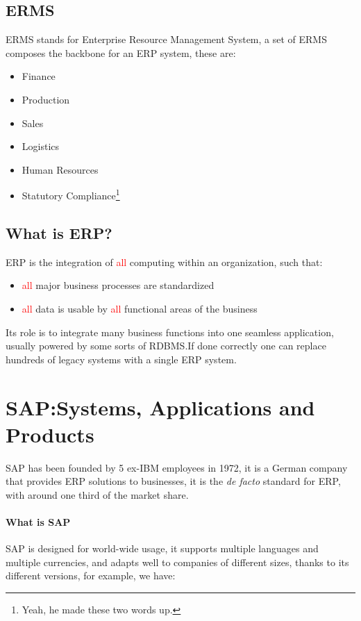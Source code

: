 \documentclass[openright, twoside, twocolumn, a4paper, 10pt]{report}
\begin{document}
\subsection{ERMS}
ERMS stands for Enterprise Resource Management System, a set of ERMS composes
the backbone for an ERP system, these are:

\begin{itemize}
	\item Finance
	\item Production
	\item Sales
	\item Logistics
	\item Human Resources
	\item Statutory Compliance\footnote{Yeah, he made these two words up.}
\end{itemize}

\subsection{What is ERP?}
ERP is the integration of \textcolor{red}{all} computing within an organization, such that:

\begin{itemize}
	\item \textcolor{red}{all} major business processes are standardized
	\item \textcolor{red}{all} data is usable by \textcolor{red}{all} functional
	      areas of the business
\end{itemize}

Its role is to integrate many business functions into one seamless application, usually
powered by some sorts of RDBMS.\@ If done correctly one can replace hundreds of
legacy systems with a single ERP system.

\section{SAP:\@ Systems, Applications and Products}
SAP has been founded by 5 ex-IBM employees in 1972, it is a German company that
provides ERP solutions to businesses, it is the \emph{de facto} standard for ERP, with
around one third of the market share.

\paragraph{What is SAP}
SAP is designed for world-wide usage, it supports multiple languages and multiple currencies, and adapts well to companies of different sizes, thanks to its different
versions, for example, we have:
\end{document}
